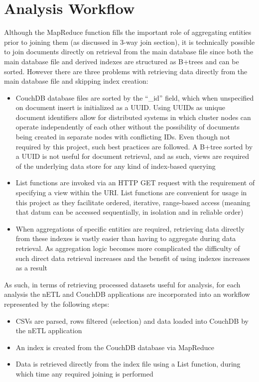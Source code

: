 \section{Analysis Workflow}
Although the MapReduce function fills the important role of aggregating entities prior to joining them (as discussed in 3-way join section), it is technically possible to join documents directly on retrieval from the main database file since both the main database file and derived indexes are structured as B+trees and can be sorted. However there are three problems with retrieving data directly from the main database file and skipping index creation:

\begin{itemize}
    \item CouchDB database files are sorted by the ``\_id'' field, which when unspecified on document insert is initialized as a UUID. Using UUIDs as unique document identifiers allow for distributed systems in which cluster nodes can operate independently of each other without the possibility of documents being created in separate nodes with conflicting IDs. Even though not required by this project, such best practices are followed. A B+tree sorted by a UUID is not useful for document retrieval, and as such, views are required of the underlying data store for any kind of index-based querying
    \item List functions are invoked via an HTTP GET request with the requirement of specifying a view within the URI. List functions are convenient for usage in this project as they facilitate ordered, iterative, range-based access (meaning that datum can be accessed sequentially, in isolation and in reliable order)
    \item When aggregations of specific entities are required, retrieving data directly from these indexes is vastly easier than having to aggregate during data retrieval. As aggregation logic becomes more complicated the difficulty of such direct data retrieval increases and the benefit of using indexes increases as a result
\end{itemize}

As such, in terms of retrieving processed datasets useful for analysis, for each analysis the nETL and CouchDB applications are incorporated into an workflow represented by the following steps:

\begin{itemize}
    \item CSVs are parsed, rows filtered (selection) and data loaded into CouchDB by the nETL application
    \item An index is created from the CouchDB database via MapReduce
    \item Data is retrieved directly from the index file using a List function, during which time any required joining is performed
\end{itemize}


